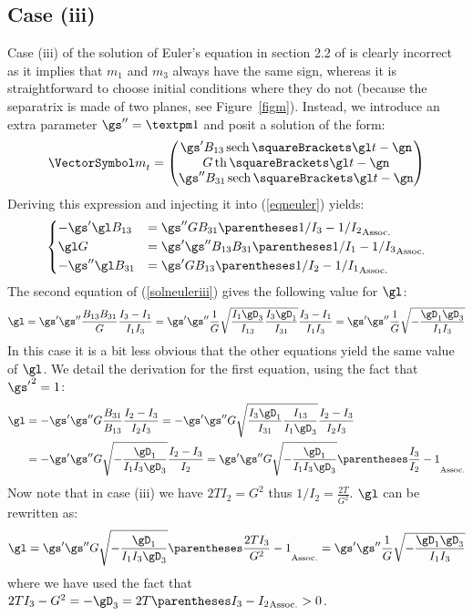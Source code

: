 \documentclass[10pt, a4paper, twoside]{basestyle}
\begin{document}
\subsection*{Case (iii)}
Case (iii) of the solution of Euler's equation in section 2.2 of \cite{Celledoni2007} is clearly incorrect as it implies that $m_1$ and $m_3$
always have the same sign, whereas it is straightforward to choose initial conditions where they do not (because the separatrix is made of two
planes, see Figure~\ref{figm}).  Instead, we introduce an extra parameter $\gs'' = ±1$ and posit a solution of the form:
\[
{\vm}_t =
\begin{pmatrix}
\gs' B_{13} \HyperbolicSecant\of{\gl t - \gn} \\
G \HyperbolicTangent\of{\gl t - \gn} \\
\gs'' B_{31} \HyperbolicSecant\of{\gl t - \gn}
\end{pmatrix}
\]
Deriving this expression and injecting it into (\ref{eqneuler}) yields:
\begin{equation}
\begin{dcases}
-\gs' \gl B_{13} &= \gs'' G B_{31} \pa{1/I_3 - 1/I_2} \\
\gl G &= \gs' \gs'' B_{13} B_{31} \pa{1/I_1 - 1/I_3} \\
-\gs'' \gl B_{31} &= \gs' G B_{13} \pa{1/I_2 - 1/I_1}
\end{dcases}
\label{solneuleriii}
\end{equation}
The second equation of (\ref{solneuleriii}) gives the following value for $\gl$:
\[
\gl = \gs' \gs'' \frac{B_{13} B_{31}}{G} \frac{I_3 - I_1}{I_1 I_3}
= \gs' \gs'' \frac{1}{G} \sqrt{\frac{I_1 \gD_3}{I_{13}} \frac{I_3 \gD_1}{I_{31}}} \frac{I_3 - I_1}{I_1 I_3}
= \gs' \gs'' \frac{1}{G} \sqrt{-\frac{\gD_1 \gD_3}{I_1 I_3}}
\]
In this case it is a bit less obvious that the other equations yield the same value of $\gl$.  We detail the derivation for the first equation,
using the fact that ${\gs'}^2 = 1$:
\begin{align*}
\gl &= -\gs' \gs'' G \frac{B_{31}}{B_{13}} \frac{I_2 - I_3}{I_2 I_3}
= -\gs' \gs'' G \sqrt{\frac{I_3 \gD_1}{I_{31}} \frac{I_{13}}{I_1 \gD_3}} \frac{I_2 - I_3}{I_2 I_3} \\
&= -\gs' \gs'' G \sqrt{-\frac{\gD_1}{I_1 I_3 \gD_3}} \frac{I_2 - I_3}{I_2}
= \gs' \gs'' G \sqrt{-\frac{\gD_1}{I_1 I_3 \gD_3}} \pa{\frac{I_3}{I_2} - 1}
\end{align*}
Now note that in case (iii) we have $2 T I_2 = G^2$ thus $1/I_2 = \frac{2 T}{G^2}$.  $\gl$ can be rewritten as:
\[
\gl = \gs' \gs'' G \sqrt{-\frac{\gD_1}{I_1 I_3 \gD_3}} \pa{\frac{2 T I_3}{G^2} - 1} = \gs' \gs'' \frac{1}{G} \sqrt{-\frac{\gD_1 \gD_3}{I_1 I_3}}
\]
where we have used the fact that $2 T I_3 - G^2 = -\gD_3 = 2 T \pa{I_3 - I_2} > 0$.
\end{document}
